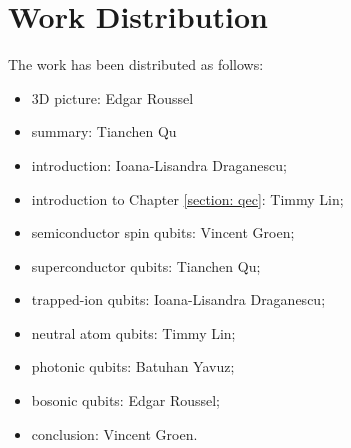 \section{Work Distribution}\label{section: distribution}
The work has been distributed as follows:
\begin{itemize}  
    \item 3D picture: Edgar Roussel
    \item summary: Tianchen Qu
    \item introduction: Ioana-Lisandra Draganescu;
    \item introduction to Chapter \ref{section: qec}: Timmy Lin;
    \item semiconductor spin qubits: Vincent Groen;
    \item superconductor qubits: Tianchen Qu;
    \item trapped-ion qubits: Ioana-Lisandra Draganescu;
    \item neutral atom qubits: Timmy Lin;
    \item photonic qubits: Batuhan Yavuz;
    \item bosonic qubits: Edgar Roussel;
    \item conclusion: Vincent Groen.
\end{itemize}